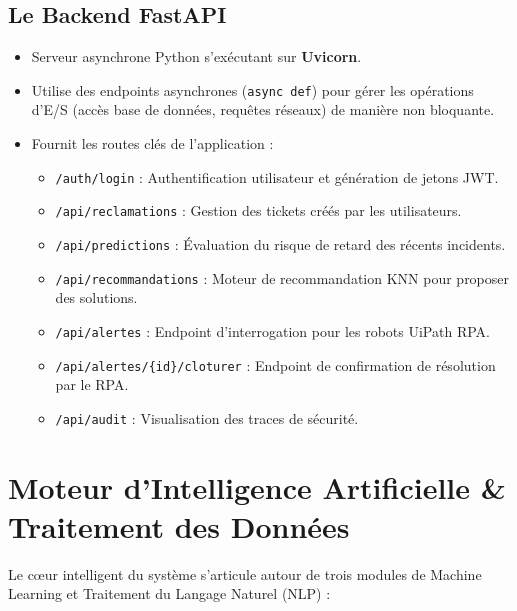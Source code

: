 \documentclass[11pt,a4paper]{article}
\begin{document}
\subsection{Le Backend FastAPI}
\begin{itemize}
    \item Serveur asynchrone Python s'exécutant sur \textbf{Uvicorn}.
    \item Utilise des endpoints asynchrones (\texttt{async def}) pour gérer les opérations d'E/S (accès base de données, requêtes réseaux) de manière non bloquante.
    \item Fournit les routes clés de l'application :
    \begin{itemize}
        \item \texttt{/auth/login} : Authentification utilisateur et génération de jetons JWT.
        \item \texttt{/api/reclamations} : Gestion des tickets créés par les utilisateurs.
        \item \texttt{/api/predictions} : Évaluation du risque de retard des récents incidents.
        \item \texttt{/api/recommandations} : Moteur de recommandation KNN pour proposer des solutions.
        \item \texttt{/api/alertes} : Endpoint d'interrogation pour les robots UiPath RPA.
        \item \texttt{/api/alertes/\{id\}/cloturer} : Endpoint de confirmation de résolution par le RPA.
        \item \texttt{/api/audit} : Visualisation des traces de sécurité.
    \end{itemize}
\end{itemize}

\section{Moteur d'Intelligence Artificielle \& Traitement des Données}

Le cœur intelligent du système s'articule autour de trois modules de Machine Learning et Traitement du Langage Naturel (NLP) :
\end{document}
